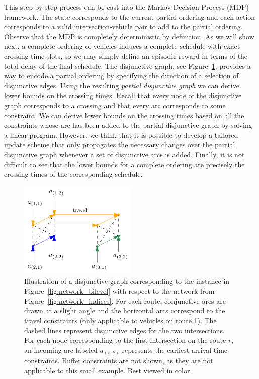 \documentclass{article}
\theoremstyle{definition}
\theoremstyle{plain}
\begin{document}
This step-by-step process can be cast into the Markov Decision Process (MDP)
framework.
The state corresponds to the current partial ordering and each action
corresponds to a valid intersection-vehicle pair to add to the partial ordering.
Observe that the MDP is completely deterministic by definition. As we will show
next, a complete ordering of vehicles induces a complete schedule with exact
crossing time slots, so we may simply define an episodic reward in terms of the
total delay of the final schedule.
The disjunctive graph, see Figure~\ref{fig:disjunctive_graph}, provides a way to
encode a partial ordering by specifying the direction of a selection of
disjunctive edges.
Using the resulting \textit{partial disjunctive graph} we can derive lower bounds on the crossing
times. Recall that every node of the disjunctive graph corresponds to a crossing
and that every arc corresponds to some constraint. We can derive lower bounds on
the crossing times based on all the constraints whose arc has been added to the
partial disjunctive graph by solving a linear program.
However, we think that it is possible to develop a tailored update scheme that
only propagates the necessary changes over the partial disjunctive graph
whenever a set of disjunctive arcs is added.
Finally, it is not difficult to see that the lower bounds for a complete ordering are
precisely the crossing times of the corresponding schedule.

\begin{figure}[h]
  \centering
  \includegraphics[width=0.5\textwidth]{figures/disjunctive_graph.pdf}
  \caption{Illustration of a disjunctive graph corresponding to the instance in
    Figure~\ref{fig:network_bilevel} with respect to the network from
    Figure~\ref{fig:network_indices}. For each route, conjunctive arcs are drawn
    at a slight angle and the horizontal arcs correspond to the travel
    constraints (only applicable to vehicles on route 1). The dashed lines
    represent disjunctive edges for the two intersections. For each node
    corresponding to the first intersection on the route $r$, an incoming arc
    labeled $a_{(r,k)}$ represents the earliest arrival time constraints. Buffer
    constraints are not shown, as they are not applicable to this small
    example. Best viewed in color.}
  \label{fig:disjunctive_graph}
\end{figure}
\end{document}
